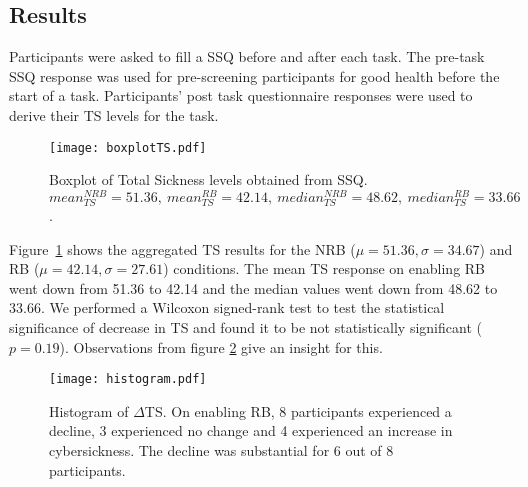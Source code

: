 \documentclass{vgtc}                          %
\begin{document}
\subsection{Results}

Participants were asked to fill a SSQ before and after each task. The pre-task SSQ response was used for pre-screening participants for good health before the start of a task. Participants' post task questionnaire responses were used to derive their TS levels for the task. 

\begin{figure}[h]
	\vspace{-8pt}
	\centering
	\texttt{[image: boxplotTS.pdf]}

	\caption{ Boxplot of Total Sickness levels obtained from SSQ. $mean^{NRB}_{TS} = 51.36,\ mean^{RB}_{TS} = 42.14,\ median^{NRB}_{TS} = 48.62,\ median^{RB}_{TS} = 33.66$.}
	\label{fig:boxplotTS}
	\vspace{-8pt}
\end{figure}

Figure~\ref{fig:boxplotTS} shows the aggregated TS results for the NRB ($\mu = 51.36, \sigma = 34.67$) and RB ($\mu = 42.14, \sigma  = 27.61$) conditions. The mean TS response on enabling RB went down from 51.36 to 42.14 and the median values went down from 48.62 to 33.66. We performed a Wilcoxon signed-rank test to test the statistical significance of decrease in TS and found it to be not statistically significant ($p = 0.19$). Observations from figure \ref{fig:histogram} give an insight for this. 
	
\begin{figure}[h]
\vspace{-8pt}
	\centering
	\texttt{[image: histogram.pdf]}
	\vspace{-12pt}
	\caption{ Histogram of $\Delta$TS. On enabling RB, 8 participants experienced a decline, 3 experienced no change and 4 experienced an increase in cybersickness. The decline was substantial for 6 out of 8 participants.}
	\label{fig:histogram}
	\vspace{-8pt}
\end{figure}
\end{document}
